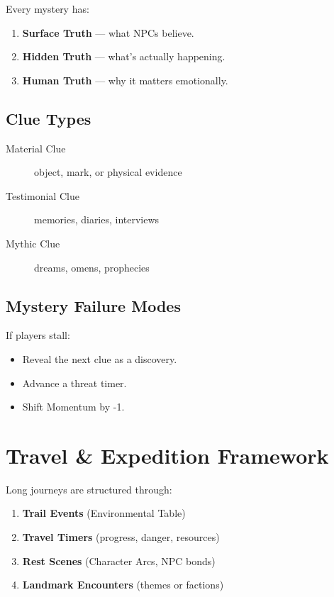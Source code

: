 \documentclass[11pt]{article}
\begin{document}
Every mystery has:
\begin{enumerate}
    \item \textbf{Surface Truth} --- what NPCs believe.
    \item \textbf{Hidden Truth} --- what's actually happening.
    \item \textbf{Human Truth} --- why it matters emotionally.
\end{enumerate}

\subsection{Clue Types}

\begin{description}
    \item[Material Clue] object, mark, or physical evidence
    \item[Testimonial Clue] memories, diaries, interviews
    \item[Mythic Clue] dreams, omens, prophecies
\end{description}

\subsection{Mystery Failure Modes}
If players stall:
\begin{itemize}
    \item Reveal the next clue as a discovery.
    \item Advance a threat timer.
    \item Shift Momentum by -1.
\end{itemize}


\section{Travel \& Expedition Framework}
\label{appendix:travel}

Long journeys are structured through:

\begin{enumerate}
    \item \textbf{Trail Events} (Environmental Table)
    \item \textbf{Travel Timers} (progress, danger, resources)
    \item \textbf{Rest Scenes} (Character Arcs, NPC bonds)
    \item \textbf{Landmark Encounters} (themes or factions)
\end{enumerate}
\end{document}
